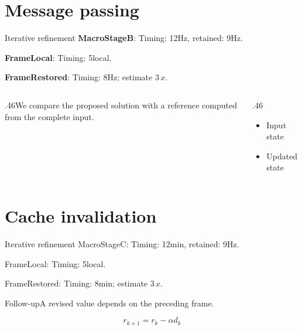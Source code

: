 \documentclass[9pt,aspectratio=169]{beamer}
\newcommand{\fuzzlayerA}[1]{\textbf{#1}}
\newcommand{\fuzzterm}[1]{\fuzzlayerA{#1}}
\newcommand{\fuzzpair}[2]{\fuzzterm{#1}: #2}
\newcommand{\fuzzunit}{Hz}
\let\fuzzoriginalunit\fuzzunit
\newcommand{\fuzzcoefficient}{3}
\newcommand{\fuzzscale}[2][\fuzzcoefficient]{#1\,#2}
\begin{document}
\section{Message passing}
\begin{frame}[t]{Iterative refinement}
\fuzzpair{MacroStageB}{Timing: 12\fuzzunit, retained: 9\fuzzoriginalunit.}\par
{\renewcommand{\fuzzunit}{local}\fuzzpair{FrameLocal}{Timing: 5\fuzzunit.}\par}
\fuzzpair{FrameRestored}{Timing: 8\fuzzunit; estimate $\fuzzscale{x}$.}\par
\begin{columns}[T]\begin{column}{.46\textwidth}We compare the proposed solution with a reference computed from the complete input.\end{column}\begin{column}{.46\textwidth}\begin{itemize}\item Input state\item Updated state\end{itemize}\end{column}\end{columns}
\end{frame}
\renewcommand{\fuzzunit}{min}
\renewcommand{\fuzzcoefficient}{3}
\renewcommand{\fuzzterm}[1]{{\textrm{#1}}}
\section{Cache invalidation}
\begin{frame}[t]{Iterative refinement}
\fuzzpair{MacroStageC}{Timing: 12\fuzzunit, retained: 9\fuzzoriginalunit.}\par
{\renewcommand{\fuzzunit}{local}\fuzzpair{FrameLocal}{Timing: 5\fuzzunit.}\par}
\fuzzpair{FrameRestored}{Timing: 8\fuzzunit; estimate $\fuzzscale{x}$.}\par
\begin{block}{Follow-up}\fuzzterm{A revised value} depends on the preceding frame.\end{block}
\[r_{k+1}=r_k-\alpha d_k\]
\end{frame}
\renewcommand{\fuzzunit}{us}
\renewcommand{\fuzzcoefficient}{4}
\renewcommand{\fuzzterm}[1]{{\textit{#1}}}
\end{document}
